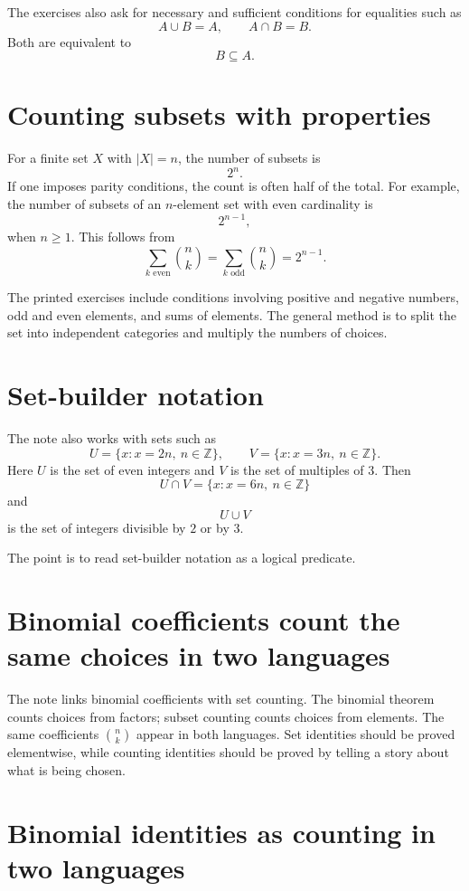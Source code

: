 The exercises also ask for necessary and sufficient conditions for equalities such as
\[
  A\cup B=A,\qquad A\cap B=B.
\]
Both are equivalent to
\[
  B\subseteq A.
\]

\section{Counting subsets with properties}

For a finite set $X$ with $|X|=n$, the number of subsets is
\[
  2^n.
\]
If one imposes parity conditions, the count is often half of the total.  For example, the number of subsets of an $n$-element set with even cardinality is
\[
  2^{n-1},
\]
when $n\ge1$.  This follows from
\[
  \sum_{k\text{ even}}\binom nk
  =
  \sum_{k\text{ odd}}\binom nk
  =2^{n-1}.
\]

The printed exercises include conditions involving positive and negative numbers, odd and even elements, and sums of elements.  The general method is to split the set into independent categories and multiply the numbers of choices.

\section{Set-builder notation}

The note also works with sets such as
\[
  U=\{x:x=2n,\ n\in\mathbb Z\},\qquad
  V=\{x:x=3n,\ n\in\mathbb Z\}.
\]
Here $U$ is the set of even integers and $V$ is the set of multiples of $3$.  Then
\[
  U\cap V=\{x:x=6n,\ n\in\mathbb Z\}
\]
and
\[
  U\cup V
\]
is the set of integers divisible by $2$ or by $3$.

The point is to read set-builder notation as a logical predicate.

\section{Binomial coefficients count the same choices in two languages}

The note links binomial coefficients with set counting.  The binomial theorem counts choices from factors; subset counting counts choices from elements.  The same coefficients $\binom nk$ appear in both languages.  Set identities should be proved elementwise, while counting identities should be proved by telling a story about what is being chosen.

\section{Binomial identities as counting in two languages}

